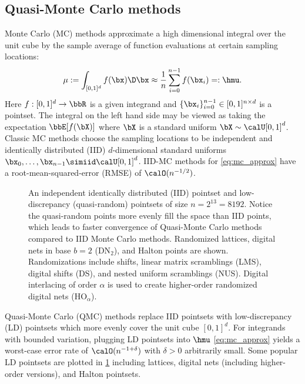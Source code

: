 \documentclass[acmsmall]{acmart}
\begin{document}
\subsection{Quasi-Monte Carlo methods}

Monte Carlo (MC) methods approximate a high dimensional integral over the unit cube by the sample average of function evaluations at certain sampling locations:
\begin{equation}
    \mu := \int_{[0,1]^d} f(\bx) \D \bx \approx \frac{1}{n} \sum_{i=0}^{n-1} f(\bx_i) =: \hmu.
    \label{eq:mc_approx}
\end{equation}
Here $f: [0,1]^d \to \bbR$ is a given integrand and $\{\bx_i\}_{i=0}^{n-1} \in [0,1]^{n \times d}$ is a pointset. The integral on the left hand side may be viewed as taking the expectation $\bbE[f(\bX)]$ where $\bX$ is a standard uniform $\bX \sim \calU[0,1]^d$. Classic MC methods choose the sampling locations to be independent and identically distributed (IID) $d$-dimensional standard uniforms $\bx_0,\dots,\bx_{n-1} \simiid \calU[0,1]^d$. IID-MC methods for \eqref{eq:mc_approx} have a root-mean-squared-error (RMSE) of $\calO(n^{-1/2})$.

\begin{figure}%
    \centering
    \caption{An independent identically distributed (IID) pointset and low-discrepancy (quasi-random) pointsets of size $n=2^{13}=8192$. Notice the quasi-random points more evenly fill the space than IID points, which leads to faster convergence of Quasi-Monte Carlo methods compared to IID Monte Carlo methods. Randomized lattices, digital nets in base $b=2$ (DN${}_{2}$), and Halton points are shown. Randomizations include shifts, linear matrix scramblings (LMS), digital shifts (DS), and nested uniform scramblings (NUS). Digital interlacing of order $\alpha$ is used to create higher-order randomized digital nets (HO${}_\alpha$).}
    \Description[]{}
    \label{fig:pointsets}
\end{figure}

Quasi-Monte Carlo (QMC) methods \citep{niederreiter.qmc_book,dick.digital_nets_sequences_book,kroese.handbook_mc_methods,dick2022lattice,lemieux2009monte,sloan1994lattice} replace IID pointsets with low-discrepancy (LD) pointsets which more evenly cover the unit cube $[0,1]^d$. For integrands with bounded variation, plugging LD pointsets into $\hmu$ \eqref{eq:mc_approx} yields a worst-case error rate of $\calO(n^{-1+\delta})$ with $\delta>0$ arbitrarily small. Some popular LD pointsets are plotted in \cref{fig:pointsets} including lattices, digital nets (including higher-order versions), and Halton pointsets.
\end{document}
